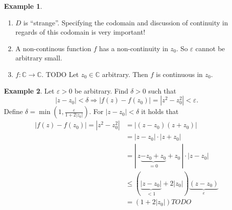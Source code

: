 \documentclass[a4paper,landscape,twocolumn]{article}
\theoremstyle{definition}
\newtheorem{ex}{Example}
\newcommand\abs[1]{\left|#1\right|}
\begin{document}
\begin{ex}
  \begin{enumerate}
    \item $D$ is \enquote{strange}.
      Specifying the codomain and discussion of continuity in regards of this codomain is very important!
    \item A non-continous function
      $f$ has a non-continuity in $z_0$.
      So $\varepsilon$ cannot be arbitrary small.
    \item
      $f: \mathbb C \rightarrow \mathbb C$. TODO
      Let $z_0 \in \mathbb C$ arbitrary. Then $f$ is continuous in $z_0$.
  \end{enumerate}
\end{ex}
%
\begin{ex}
  Let $\varepsilon > 0$ be arbitrary. Find $\delta > 0$ such that
  \[ \abs{z - z_0} < \delta \Rightarrow \abs{f(z) - f(z_0)} = \abs{z^2 - z_0^2} < \varepsilon. \]
  Define $\delta = \min\left(1, \frac{\varepsilon}{1 + 2\abs{z_0}}\right)$.
  For $\abs{z - z_0} < \delta$ it holds that
  \begin{align*}
    \abs{f(z) - f(z_0)} = \abs{z^2 - z_0^2}
    &= \abs{(z - z_0) (z + z_0)} \\
    &= \abs{z - z_0} \cdot \abs{z + z_0} \\
    &= |\, z \underbrace{- z_0 + z_0}_{=0} + z_0\,| \cdot \abs{z - z_0} \\
    &\leq (\underbrace{\abs{z - z_0}}_{<1} + 2 \abs{z_0}) \underbrace{(z - z_0)}_{\varepsilon} \\
    &= \left(1 + 2 \abs{z_0}\right) TODO
  \end{align*}
\end{ex}
%
\end{document}
